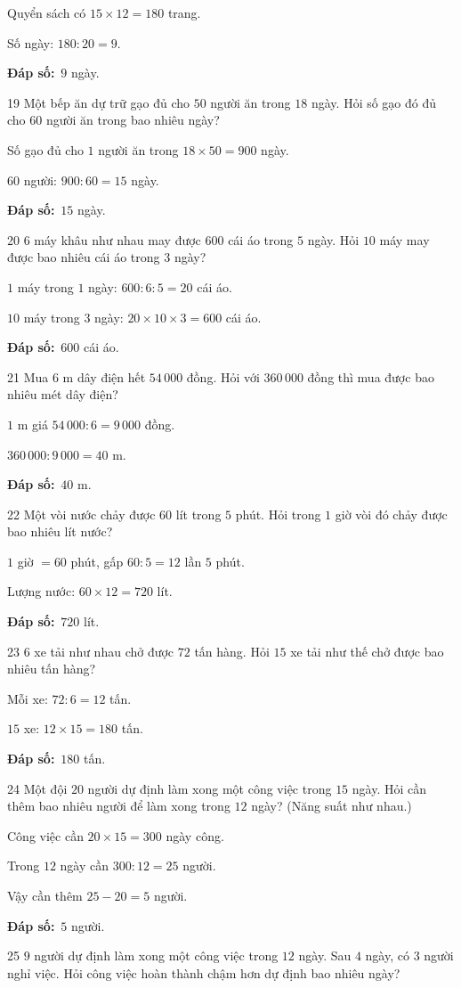 \documentclass[11pt]{article}
\newif\ifsol \solfalse
\providecommand{\AnsWord}{Đáp số}
\newcommand{\dapso}[1]{\par\textbf{\AnsWord:}\ #1}
\newcommand{\probsol}[1]{%
  \begin{lrbox}{\solmeasure}\begin{minipage}{\dimexpr\linewidth-24pt\relax}#1\end{minipage}\end{lrbox}%
  \ifsol
    \begin{solbox}#1\end{solbox}%
  \else
    \setlength{\solht}{\dimexpr\ht\solmeasure+\dp\solmeasure+0.85cm\relax}%
    \ifdim\solht<1.35cm\setlength{\solht}{1.35cm}\fi
    \begin{tcolorbox}[colback=white,colframe=Line,boxrule=0.8pt,arc=5pt,
      left=8pt,right=8pt,top=4pt,bottom=4pt,height=\solht]{\footnotesize\color{Slate}\itshape\WorkWord}\end{tcolorbox}%
  \fi}
\newcommand{\gap}{\vspace{0.3cm}}
\def\WorkWord{Bài làm:}
\def\AnsWord{Đáp số}
\begin{document}
\probsol{
Quyển sách có $15\times12=180$ trang.\par Số ngày: $180:20=9$.
\dapso{$9$ ngày.}}
\gap
\begin{probbox}{19}{\relax}
Một bếp ăn dự trữ gạo đủ cho $50$ người ăn trong $18$ ngày. Hỏi số gạo đó đủ cho $60$ người ăn trong bao nhiêu ngày?
\end{probbox}
\probsol{
Số gạo đủ cho $1$ người ăn trong $18\times50=900$ ngày.\par $60$ người: $900:60=15$ ngày.
\dapso{$15$ ngày.}}
\gap
\begin{probbox}{20}{\relax}
$6$ máy khâu như nhau may được $600$ cái áo trong $5$ ngày. Hỏi $10$ máy may được bao nhiêu cái áo trong $3$ ngày?
\end{probbox}
\probsol{
$1$ máy trong $1$ ngày: $600:6:5=20$ cái áo.\par $10$ máy trong $3$ ngày: $20\times10\times3=600$ cái áo.
\dapso{$600$ cái áo.}}
\gap
\begin{probbox}{21}{\relax}
Mua $6$ m dây điện hết $54\,000$ đồng. Hỏi với $360\,000$ đồng thì mua được bao nhiêu mét dây điện?
\end{probbox}
\probsol{
$1$ m giá $54\,000:6=9\,000$ đồng.\par $360\,000:9\,000=40$ m.
\dapso{$40$ m.}}
\gap
\begin{probbox}{22}{\relax}
Một vòi nước chảy được $60$ lít trong $5$ phút. Hỏi trong $1$ giờ vòi đó chảy được bao nhiêu lít nước?
\end{probbox}
\probsol{
$1$ giờ $=60$ phút, gấp $60:5=12$ lần $5$ phút.\par Lượng nước: $60\times12=720$ lít.
\dapso{$720$ lít.}}
\gap
\begin{probbox}{23}{\relax}
$6$ xe tải như nhau chở được $72$ tấn hàng. Hỏi $15$ xe tải như thế chở được bao nhiêu tấn hàng?
\end{probbox}
\probsol{
Mỗi xe: $72:6=12$ tấn.\par $15$ xe: $12\times15=180$ tấn.
\dapso{$180$ tấn.}}
\gap
\begin{probbox}{24}{\relax}
Một đội $20$ người dự định làm xong một công việc trong $15$ ngày. Hỏi cần thêm bao nhiêu người để làm xong trong $12$ ngày? (Năng suất như nhau.)
\end{probbox}
\probsol{
Công việc cần $20\times15=300$ ngày công.\par Trong $12$ ngày cần $300:12=25$ người.\par Vậy cần thêm $25-20=5$ người.
\dapso{$5$ người.}}
\gap
\begin{probbox}{25}{\relax}
$9$ người dự định làm xong một công việc trong $12$ ngày. Sau $4$ ngày, có $3$ người nghỉ việc. Hỏi công việc hoàn thành chậm hơn dự định bao nhiêu ngày?
\end{probbox}
\end{document}
